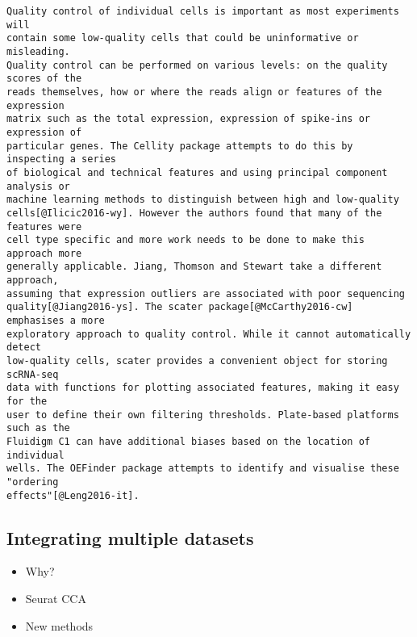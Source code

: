 \documentclass[11pt,a4paper,titlepage,twoside,openright]{style/unimelbthesis}
\theoremstyle{definition}
\theoremstyle{definition}
\theoremstyle{definition}
\theoremstyle{remark}
\begin{document}
\begin{mainmatter}
\begin{verbatim}
Quality control of individual cells is important as most experiments will
contain some low-quality cells that could be uninformative or misleading.
Quality control can be performed on various levels: on the quality scores of the
reads themselves, how or where the reads align or features of the expression
matrix such as the total expression, expression of spike-ins or expression of
particular genes. The Cellity package attempts to do this by inspecting a series
of biological and technical features and using principal component analysis or
machine learning methods to distinguish between high and low-quality
cells[@Ilicic2016-wy]. However the authors found that many of the features were
cell type specific and more work needs to be done to make this approach more
generally applicable. Jiang, Thomson and Stewart take a different approach,
assuming that expression outliers are associated with poor sequencing
quality[@Jiang2016-ys]. The scater package[@McCarthy2016-cw] emphasises a more
exploratory approach to quality control. While it cannot automatically detect
low-quality cells, scater provides a convenient object for storing scRNA-seq
data with functions for plotting associated features, making it easy for the
user to define their own filtering thresholds. Plate-based platforms such as the
Fluidigm C1 can have additional biases based on the location of individual
wells. The OEFinder package attempts to identify and visualise these "ordering
effects"[@Leng2016-it].
\end{verbatim}

\hypertarget{integrating-multiple-datasets}{%
\subsection{Integrating multiple datasets}\label{integrating-multiple-datasets}}

\begin{itemize}
\tightlist
\item
  Why?
\item
  Seurat CCA
\item
  New methods
\end{itemize}


\end{mainmatter}
\end{document}
